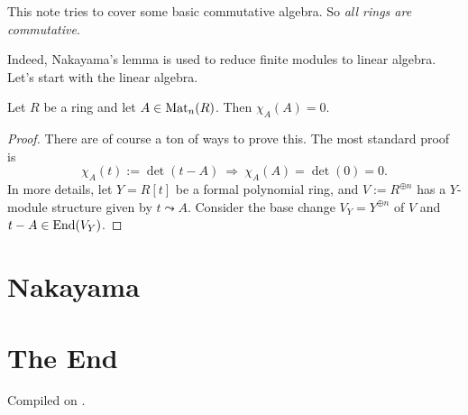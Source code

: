 \documentclass{article}
\begin{document}
\self

This note tries to cover some basic commutative algebra. So \emph{all rings are commutative}.

Indeed, Nakayama's lemma is used to reduce finite modules to linear algebra. Let's start with the linear algebra.

\begin{theorem}
    Let $R$ be a ring and let $A\in\operatorname{Mat}_{n}(R)$. Then $\chi_A(A)=0$.
\end{theorem}

\begin{proof}
    There are of course a ton of ways to prove this. The most standard proof is
    \[
        \chi_A(t):=\det(t-A) \ \Longrightarrow\ \chi_A(A)=\det(0)=0.
    \]
    In more details, let $Y=R[t]$ be a formal polynomial ring, and $V:=R^{\oplus n}$ has a $Y$-module structure given by $t\leadsto A$. Consider the base change $V_Y=Y^{\oplus n}$ of $V$ and $t-A\in\operatorname{End}(V_Y)$. 
\end{proof}

\section{Nakayama}

\section*{The End}



\noindent Compiled on \todayymd.

\noindent\home
\end{document}

